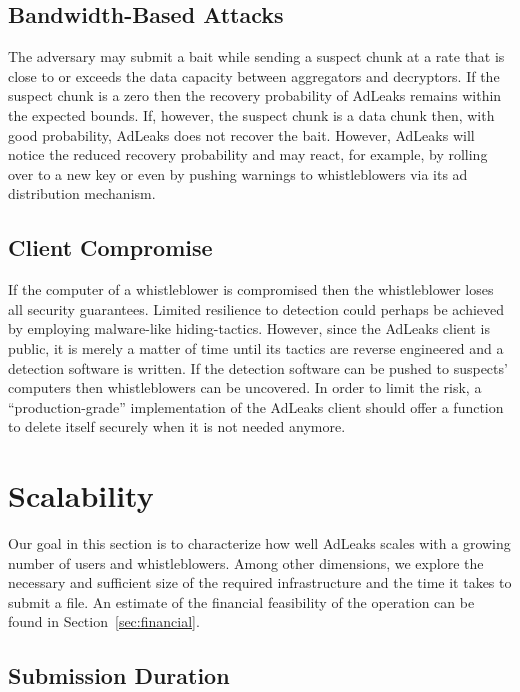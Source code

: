 \documentclass[twocolumn,10pt]{article}
\begin{document}
\subsection{Bandwidth-Based Attacks}

The adversary may submit a bait while sending a suspect chunk at a rate that
is close to or exceeds the data capacity between aggregators and decryptors.
If the suspect chunk is a zero then the recovery probability of AdLeaks
remains within the expected bounds.  If, however, the suspect chunk is a
data chunk then, with good probability, AdLeaks does not recover the bait.
However, AdLeaks will notice the reduced recovery probability and may react,
for example, by rolling over to a new key or even by pushing warnings to
whistleblowers via its ad distribution mechanism.


\subsection{Client Compromise}

If the computer of a whistleblower is compromised then the whistleblower
loses all security guarantees.  Limited resilience to detection could
perhaps be achieved by employing malware-like hiding-tactics.  However,
since the AdLeaks client is public, it is merely a matter of time until its
tactics are reverse engineered and a detection software is written.  If the
detection software can be pushed to suspects' computers then whistleblowers
can be uncovered.  In order to limit the risk, a ``production-grade''
implementation of the AdLeaks client should offer a function to delete
itself securely when it is not needed anymore.


\section{Scalability}

Our goal in this section is to characterize how well AdLeaks scales with a
growing number of users and whistleblowers.  Among other dimensions, we
explore the necessary and sufficient size of the required infrastructure and
the time it takes to submit a file.  An estimate of the financial
feasibility of the operation can be found in Section~\ref{sec:financial}.

\subsection{Submission Duration}
\end{document}
